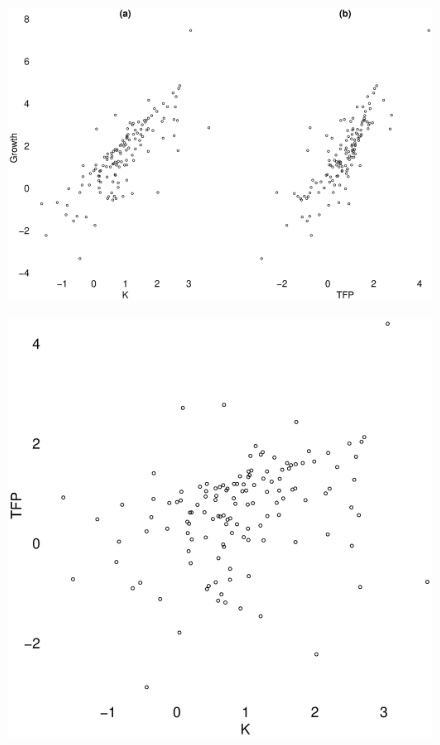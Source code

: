 \documentclass{beamer}
\begin{document}
\begin{frame}
  \begin{figure}
    \includegraphics[scale=.3]{growth.eps}
  \end{figure}
\end{frame}

\begin{frame}
  \begin{figure}
    \includegraphics[scale=.3]{growth2.eps}
  \end{figure}
\end{frame}
\end{document}
